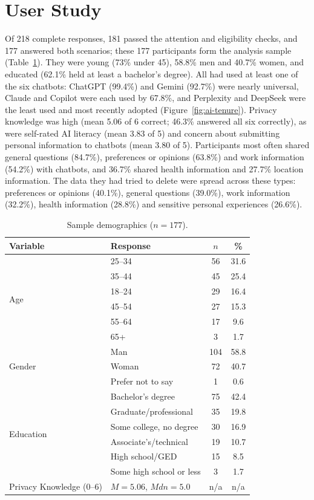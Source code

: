 \documentclass[conference,compsoc]{IEEEtran}
\begin{document}
\section{User Study}
\label{sec:sample-knowledge}

Of 218 complete responses, 181 passed the attention and eligibility checks, and 177 answered both scenarios; these 177 participants form the analysis sample (Table~\ref{tab:demographics}). They were young (73\% under 45), 58.8\% men and 40.7\% women, and educated (62.1\% held at least a bachelor's degree). All had used at least one of the six chatbots: ChatGPT (99.4\%) and Gemini (92.7\%) were nearly universal, Claude and Copilot were each used by 67.8\%, and Perplexity and DeepSeek were the least used and most recently adopted (Figure~\ref{fig:ai-tenure}). Privacy knowledge was high (mean 5.06 of 6 correct; 46.3\% answered all six correctly), as were self-rated AI literacy (mean 3.83 of 5) and concern about submitting personal information to chatbots (mean 3.80 of 5). Participants most often shared general questions (84.7\%), preferences or opinions (63.8\%) and work information (54.2\%) with chatbots, and 36.7\% shared health information and 27.7\% location information. The data they had tried to delete were spread across these types: preferences or opinions (40.1\%), general questions (39.0\%), work information (32.2\%), health information (28.8\%) and sensitive personal experiences (26.6\%).

\begin{table}[t]
\centering
\caption{Sample demographics ($n=177$).}
\label{tab:demographics}
\small
\setlength{\tabcolsep}{3.5pt}
\begin{tabular}{llcc}
\toprule
Variable & Response & $n$ & \% \\
\midrule
\multirow{6}{*}{Age}
 & 25--34 & 56 & 31.6 \\
 & 35--44 & 45 & 25.4 \\
 & 18--24 & 29 & 16.4 \\
 & 45--54 & 27 & 15.3 \\
 & 55--64 & 17 & 9.6 \\
 & 65+    & 3  & 1.7 \\
\midrule
\multirow{3}{*}{Gender}
 & Man               & 104 & 58.8 \\
 & Woman             & 72  & 40.7 \\
 & Prefer not to say & 1   & 0.6 \\
\midrule
\multirow{6}{*}{Education}
 & Bachelor's degree      & 75 & 42.4 \\
 & Graduate/professional  & 35 & 19.8 \\
 & Some college, no degree & 30 & 16.9 \\
 & Associate's/technical  & 19 & 10.7 \\
 & High school/GED        & 15 & 8.5 \\
 & Some high school or less & 3 & 1.7 \\
\midrule
Privacy Knowledge (0--6) & $M=5.06$, $Mdn=5.0$ & n/a & n/a \\
\bottomrule
\end{tabular}
\end{table}
\end{document}
